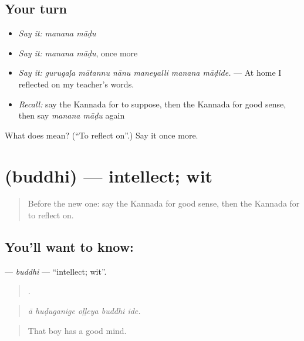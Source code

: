 \subsection*{Your turn}
\begin{itemize}
\raggedright
  \item \emph{Say it:} \emph{manana māḍu}
  \item \emph{Say it:} \emph{manana māḍu}, once more
  \item \emph{Say it:} \emph{gurugaḷa mātannu nānu maneyalli manana māḍide.} — At home I reflected on my teacher's words.
  \item \emph{Recall:} say the Kannada for to suppose, then the Kannada for good sense, then say \emph{manana māḍu} again
\end{itemize}

\begin{tcolorbox}[breakable,colback=teal!4,colframe=teal!35!black,title={Before you move on}]
What does   mean? (\textquotedblleft{}To reflect on\textquotedblright{}.) Say it once more.
\end{tcolorbox}
\section[\texorpdfstring{\kn{ಬುದ್ಧಿ} (buddhi)}{ಬುದ್ಧಿ (buddhi)}]{ (buddhi) — intellect; wit}

\label{lesson:KA-C381-buddhi}



\begin{quote}
Before the new one: say the Kannada for good sense, then the Kannada for to reflect on.
\end{quote}

\subsection*{You'll want to know: }
\textbf{} — \emph{buddhi} — \textquotedblleft{}intellect; wit\textquotedblright{}.

\begin{quote}
    .
\end{quote}

\begin{quote}
\emph{ā huḍuganige oḷḷeya buddhi ide.}
\end{quote}

\begin{quote}
That boy has a good mind.
\end{quote}

